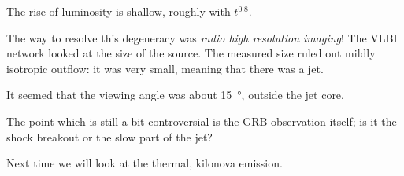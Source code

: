 \documentclass[main.tex]{subfiles}
\begin{document}
The rise of luminosity is shallow, roughly with \(t^{0.8}\). 

The way to resolve this degeneracy was \emph{radio high resolution imaging}! 
The VLBI network looked at the size of the source. 
The measured size ruled out mildly isotropic outflow: it was very small, 
meaning that there was a jet. 

It seemed that the viewing angle was about \SI{15}{\degree}, outside the jet core.

The point which is still a bit controversial is the GRB observation itself; 
is it the shock breakout or the slow part of the jet? 

Next time we will look at the thermal, kilonova emission.
\end{document}
